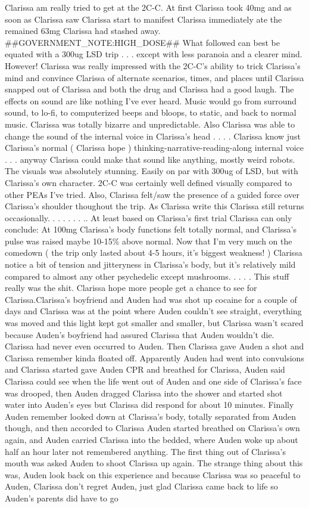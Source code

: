 \documentclass[12pt]{book}
\begin{document}
Clarissa am really tried to get at the 2C-C. At first Clarissa took 40mg and as soon as Clarissa saw Clarissa start to manifest Clarissa immediately ate the remained 63mg Clarissa had stashed away. \#\#GOVERNMENT\_NOTE:HIGH\_DOSE\#\# What followed can best be equated with a 300ug LSD trip . . .  except with less paranoia and a clearer mind. However! Clarissa was really impressed with the 2C-C's ability to trick Clarissa's mind and convince Clarissa of alternate scenarios, times, and places until Clarissa snapped out of Clarissa and both the drug and Clarissa had a good laugh. The effects on sound are like nothing I've ever heard. Music would go from surround sound, to lo-fi, to computerized beeps and bloops, to static, and back to normal music. Clarissa was totally bizarre and unpredictable. Also Clarissa was able to change the sound of the internal voice in Clarissa's head . . .  . Clarissa know just Clarissa's normal ( Clarissa hope ) thinking-narrative-reading-along internal voice . . .  anyway Clarissa could make that sound like anything, mostly weird robots. The visuals was absolutely stunning. Easily on par with 300ug of LSD, but with Clarissa's own character. 2C-C was certainly well defined visually compared to other PEAs I've tried. Also, Clarissa felt/saw the presence of a guided force over Clarissa's shoulder thoughout the trip. As Clarissa write this Clarissa still returns occasionally.  . . .   . . . .. At least based on Clarissa's first trial Clarissa can only conclude: At 100mg Clarissa's body functions felt totally normal, and Clarissa's pulse was raised maybe 10-15\% above normal. Now that I'm very much on the comedown ( the trip only lasted about 4-5 hours, it's biggest weakness! ) Clarissa notice a bit of tension and jitteryness in Clarissa's body, but it's relatively mild compared to almost any other psychedelic except mushrooms.  . . .  . This stuff really was the shit. Clarissa hope more people get a chance to see for Clarissa.Clarissa's boyfriend and Auden had was shot up cocaine for a couple of days and Clarissa was at the point where Auden couldn't see straight, everything was moved and this light kept got smaller and smaller, but Clarissa wasn't scared because Auden's boyfriend had assured Clarissa that Auden wouldn't die. Clarissa had never even occurred to Auden. Then Clarissa gave Auden a shot and Clarissa remember kinda floated off. Apparently Auden had went into convulsions and Clarissa started gave Auden CPR and breathed for Clarissa, Auden said Clarissa could see when the life went out of Auden and one side of Clarissa's face was drooped, then Auden dragged Clarissa into the shower and started shot water into Auden's eyes but Clarissa did respond for about 10 minutes. Finally Auden remember looked down at Clarissa's body, totally separated from Auden though, and then accorded to Clarissa Auden started breathed on Clarissa's own again, and Auden carried Clarissa into the bedded, where Auden woke up about half an hour later not remembered anything. The first thing out of Clarissa's mouth was asked Auden to shoot Clarissa up again. The strange thing about this was, Auden look back on this experience and because Clarissa was so peaceful to Auden, Clarissa don't regret Auden, just glad Clarissa came back to life so Auden's parents did have to go 
\end{document}

